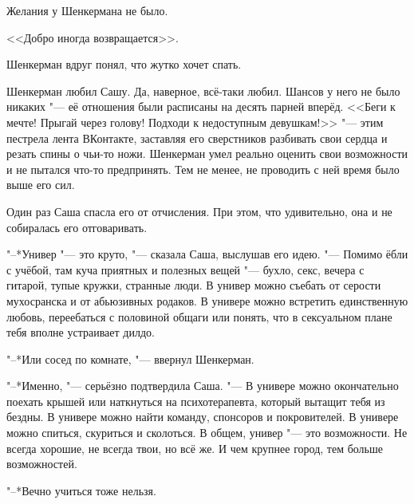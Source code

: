 Желания у Шенкермана не было.

\hspace{0.2em}






<<Добро иногда возвращается>>.

Шенкерман вдруг понял, что жутко хочет спать.

\asterism

Шенкерман любил Сашу.
Да, наверное, всё-таки любил.
Шансов у него не было никаких "--- её отношения были расписаны на десять парней вперёд.
<<Беги к мечте!
Прыгай через голову!
Подходи к недоступным девушкам!>> "--- этим пестрела лента ВКонтакте, заставляя его сверстников разбивать свои сердца и резать спины о чьи-то ножи.
Шенкерман умел реально оценить свои возможности и не пытался что-то предпринять.
Тем не менее, не проводить с ней время было выше его сил.

Один раз Саша спасла его от отчисления.
При этом, что удивительно, она и не собиралась его отговаривать.

"--*Универ "--- это круто, "--- сказала Саша, выслушав его идею.
"--- Помимо ёбли с учёбой, там куча приятных и полезных вещей "--- бухло, секс, вечера с гитарой, тупые кружки, странные люди.
В универ можно съебать от серости мухосранска и от абьюзивных родаков.
В универе можно встретить единственную любовь, переебаться с половиной общаги или понять, что в сексуальном плане тебя вполне устраивает дилдо.

"--*Или сосед по комнате, "--- ввернул Шенкерман.

"--*Именно, "--- серьёзно подтвердила Саша.
"--- В универе можно окончательно поехать крышей или наткнуться на психотерапевта, который вытащит тебя из бездны.
В универе можно найти команду, спонсоров и покровителей.
В универе можно спиться, скуриться и сколоться.
В общем, универ "--- это возможности.
Не всегда хорошие, не всегда твои, но всё же.
И чем крупнее город, тем больше возможностей.

"--*Вечно учиться тоже нельзя.

